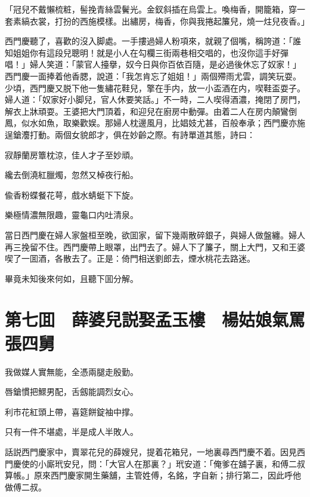 「冠兒不戴懶梳粧，髻挽青絲雲鬢光。金釵斜插在烏雲上。喚梅香，開籠箱，穿一套素縞衣裳，打扮的西施模樣。出繡房，梅香，你與我捲起簾兒，燒一炷兒夜香。」

西門慶聽了，喜歡的沒入脚處。一手摟過婦人粉項來，就親了個嘴，稱誇道：「誰知姐姐你有這段兒聰明！就是小人在勾欄三街兩巷相交唱的，也沒你這手好彈唱！」婦人笑道：「蒙官人擡擧，奴今日與你百依百隨，是必過後休忘了奴家！」西門慶一面捧着他香腮，說道：「我怎肯忘了姐姐！」兩個殢雨尤雲，調笑玩耍。少頃，西門慶又脱下他一隻繡花鞋兒，擎在手内，放一小盃酒在内，喫鞋盃耍子。婦人道：「奴家好小脚兒，官人休要笑話。」不一時，二人喫得酒濃，掩閉了房門，解衣上牀頑耍。王婆把大門頂着，和迎兒在廚房中動彈。由着二人在房内顛鸞倒鳳，似水如魚，取樂歡娱。那婦人枕邊風月，比娼妓尤甚，百般奉承；西門慶亦施逞鎗灋打動。兩個女貌郎才，俱在妙齡之際。有詩單道其態，詩曰：

寂靜蘭房簟枕涼，佳人才子至妙頑。

纔去倒澆紅臘燭，忽然又棹夜行船。

偸香粉蝶餐花萼，戲水蜻蜓下下旋。

樂極情濃無限趣，靈龜口内吐清泉。

當日西門慶在婦人家盤桓至晚，欲囬家，留下幾兩散碎銀子，與婦人做盤纏。婦人再三挽留不住。西門慶帶上眼罩，出門去了。婦人下了簾子，關上大門，又和王婆喫了一囬酒，各散去了。正是：倚門相送劉郎去，煙水桃花去路迷。

畢竟未知後來何如，且聽下囬分解。

\chapter*{第七囬　薛婆兒説娶孟玉樓　楊姑娘氣罵張四舅}

我做媒人實無能，全憑兩腿走殷勤。

唇鎗慣把鰥男配，舌劔能調烈女心。

利市花紅頭上帶，喜筵餅錠袖中撑。

只有一件不堪處，半是成人半敗人。

話説西門慶家中，賣翠花兒的薛嫂兒，提着花箱兒，一地裏尋西門慶不着。因見西門慶使的小廝玳安兒，問：「大官人在那裏？」玳安道：「俺爹在舖子裏，和傅二叔算帳。」原來西門慶家開生藥舖，主管姓傅，名銘，字自新；排行第二，因此呼他做傅二叔。


